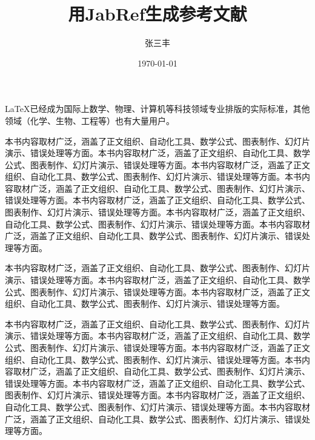 \documentclass[a4paper]{article}
\title{用JabRef生成参考文献}
\author{张三丰}
\date{\today}
\begin{document}
	\maketitle
	
	\begin{multicols}{2}
		\LaTeX 已经成为国际上数学、物理、计算机等科技领域专业排版的实际标准，其他领域（化学、生物、工程等）也有大量用户。
		
		本书内容取材广泛，涵盖了正文组织、自动化工具、数学公式、图表制作、幻灯片演示、错误处理等方面。本书内容取材广泛，涵盖了正文组织、自动化工具、数学公式、图表制作、幻灯片演示、错误处理等方面。本书内容取材广泛，涵盖了正文组织、自动化工具、数学公式、图表制作、幻灯片演示、错误处理等方面。本书内容取材广泛，涵盖了正文组织、自动化工具、数学公式、图表制作、幻灯片演示、错误处理等方面。本书内容取材广泛，涵盖了正文组织、自动化工具、数学公式、图表制作、幻灯片演示、错误处理等方面。本书内容取材广泛，涵盖了正文组织、自动化工具、数学公式、图表制作、幻灯片演示、错误处理等方面。本书内容取材广泛，涵盖了正文组织、自动化工具、数学公式、图表制作、幻灯片演示、错误处理等方面。
		
		本书内容取材广泛，涵盖了正文组织、自动化工具、数学公式、图表制作、幻灯片演示、错误处理等方面。本书内容取材广泛，涵盖了正文组织、自动化工具、数学公式、图表制作、幻灯片演示、错误处理等方面。本书内容取材广泛，涵盖了正文组织、自动化工具、数学公式、图表制作、幻灯片演示、错误处理等方面。
		
		本书内容取材广泛，涵盖了正文组织、自动化工具、数学公式、图表制作、幻灯片演示、错误处理等方面。本书内容取材广泛，涵盖了正文组织、自动化工具、数学公式、图表制作、幻灯片演示、错误处理等方面。本书内容取材广泛，涵盖了正文组织、自动化工具、数学公式、图表制作、幻灯片演示、错误处理等方面。本书内容取材广泛，涵盖了正文组织、自动化工具、数学公式、图表制作、幻灯片演示、错误处理等方面。本书内容取材广泛，涵盖了正文组织、自动化工具、数学公式、图表制作、幻灯片演示、错误处理等方面。本书内容取材广泛，涵盖了正文组织、自动化工具、数学公式、图表制作、幻灯片演示、错误处理等方面。本书内容取材广泛，涵盖了正文组织、自动化工具、数学公式、图表制作、幻灯片演示、错误处理等方面。
	\end{multicols}
 
\end{document}
